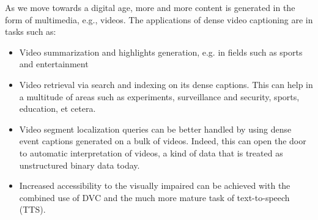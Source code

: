 \par As we move towards a digital age, more and more content is generated in the form of multimedia, e.g., videos. The applications of dense video captioning are in tasks such as:

\begin{itemize}
	\item Video summarization and highlights generation, e.g. in fields such as sports and entertainment
	\item Video retrieval via search and indexing on its dense captions. This can help in a multitude of areas such as experiments, surveillance and security, sports, education, et cetera.
	\item Video segment localization queries can be better handled by using dense event captions generated on a bulk of videos. Indeed, this can open the door to automatic interpretation of videos, a kind of data that is treated as unstructured binary data today.
	\item Increased accessibility to the visually impaired can be achieved with the combined use of DVC and the much more mature task of text-to-speech (TTS).
\end{itemize}
